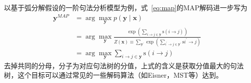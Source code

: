 以基于弧分解假设的一阶句法分析模型为例，式~\ref{eq:map}的MAP解码进一步写为
\begin{equation}
	\label{eq:map-dep}
	\begin{split}
		\boldsymbol{y}^{MAP}&=\arg\max_{\boldsymbol{y}}p(\boldsymbol{y}\mid\boldsymbol{x})\\
		&=\arg\max_{\boldsymbol{y}}\frac{\exp{\left(\sum_{i\rightarrow j\in \boldsymbol{y}}\mathrm{s}(i\rightarrow j)\right)}}{Z(\boldsymbol{x})\equiv \sum_{\boldsymbol{y}^{\prime}}\exp{\left(\sum_{i^{\prime}\rightarrow j\in \boldsymbol{y}^{\prime}}\mathrm{s}i^{\prime}\rightarrow j\right)}}\\
		&=\arg\max_{\boldsymbol{y}}\sum_{i\rightarrow j\in \boldsymbol{y}}\mathrm{s}(i\rightarrow j)
	\end{split}
\end{equation}
去掉共同的分母，分子为对应句法树的分值，上式的含义是获取分值最大的句法树，这个目标可以通过常见的一些解码算法（如Eisner，MST等）达到。

